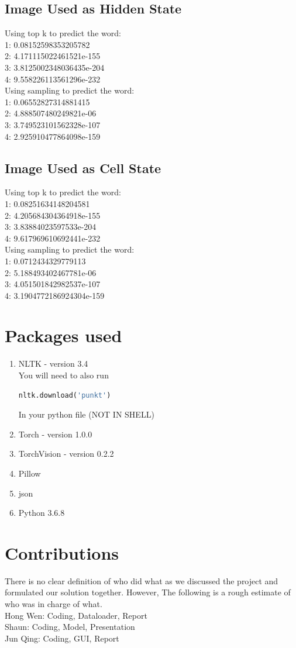 \documentclass{proc}
\begin{document}
\subsection{Image Used as Hidden State}
Using top k to predict the word:\\
1: 0.08152598353205782\\
2: 4.171115022461521e-155\\
3: 3.8125002348036435e-204\\
4: 9.558226113561296e-232\\
Using sampling to predict the word:\\
1: 0.06552827314881415\\
2: 4.888507480249821e-06\\
3: 3.749523101562328e-107\\
4: 2.925910477864098e-159
\subsection{Image Used as Cell State}
Using top k to predict the word:\\
1: 0.08251634148204581\\
2: 4.205684304364918e-155\\
3: 3.83884023597533e-204\\
4: 9.617969610692441e-232\\
Using sampling to predict the word:\\
1: 0.0712434329779113\\
2: 5.188493402467781e-06\\
3: 4.051501842982537e-107\\
4: 3.1904772186924304e-159

\section{Packages used}
\begin{enumerate}
\item NLTK - version 3.4 \\
You will need to also run 
\begin{lstlisting}[language=python]
nltk.download('punkt')
\end{lstlisting}
In your python file (NOT IN SHELL)
\item Torch - version 1.0.0
\item TorchVision - version 0.2.2
\item Pillow
\item json
\item Python 3.6.8
\end{enumerate}
\section{Contributions}
There is no clear definition of who did what as we discussed the project and formulated our solution together. However, The following is a rough estimate of who was in charge of what.\\
Hong Wen: Coding, Dataloader, Report\\
Shaun: Coding, Model, Presentation\\
Jun Qing: Coding, GUI, Report
\end{document}
